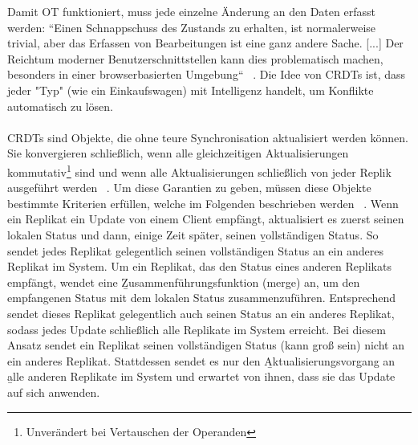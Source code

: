 Damit OT funktioniert, muss jede einzelne Änderung an den Daten erfasst werden: ``Einen Schnappschuss des Zustands zu erhalten, ist normalerweise trivial, aber das Erfassen von Bearbeitungen ist eine ganz andere Sache. [...] Der Reichtum moderner Benutzerschnittstellen kann dies problematisch machen, besonders in einer browserbasierten Umgebung`` ~\cite{diff_sync}.
%
%
Die Idee von \glspl{CRDT} ist, dass jeder "Typ" (wie ein Einkaufswagen) mit Intelligenz handelt, um Konflikte automatisch zu lösen.\\\\
CRDTs sind Objekte, die ohne teure Synchronisation aktualisiert werden können. Sie konvergieren schließlich, wenn alle gleichzeitigen Aktualisierungen kommutativ\footnote{Unverändert bei Vertauschen der Operanden} sind und wenn alle Aktualisierungen schließlich von jeder Replik ausgeführt werden ~\cite{crdt_shapiro}.
Um diese Garantien zu geben, müssen diese Objekte bestimmte Kriterien erfüllen, welche im Folgenden beschrieben werden ~\cite{crdt_shapiro2}.
Wenn ein Replikat ein Update von einem Client empfängt, aktualisiert es zuerst seinen lokalen Status und dann, einige Zeit später, seinen \b{vollständigen Status}. So sendet jedes Replikat gelegentlich seinen vollständigen Status an ein anderes Replikat im System. Um ein Replikat, das den Status eines anderen Replikats empfängt, wendet eine \b{Zusammenführungsfunktion} (merge) an, um den empfangenen Status mit dem lokalen Status zusammenzuführen. Entsprechend sendet dieses Replikat gelegentlich auch seinen Status an ein anderes Replikat, sodass jedes Update schließlich alle Replikate im System erreicht.
Bei diesem Ansatz sendet ein Replikat seinen vollständigen Status (kann groß sein) nicht an ein anderes Replikat. Stattdessen sendet es nur den \b{Aktualisierungsvorgang} an \b{alle} anderen Replikate im System und erwartet von ihnen, dass sie das Update auf sich anwenden.\\

